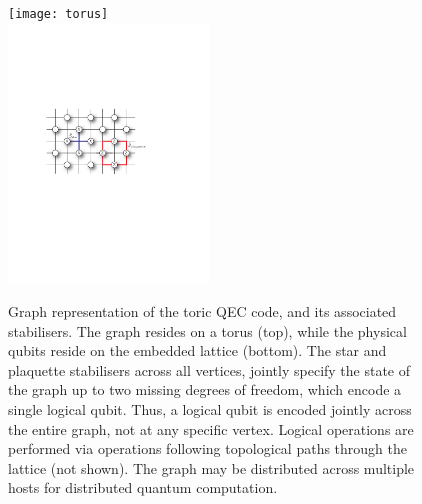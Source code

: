\doublecol
	\begin{figure}[!htbp]
		\texttt{[image: torus]}\\
		\includegraphics[clip=true, width=0.475\textwidth]{toric_code}
		\captionspacefig \caption{Graph representation of the toric QEC code, and its associated stabilisers. The graph resides on a torus (top), while the physical qubits reside on the embedded lattice (bottom). The star and plaquette stabilisers across all vertices, jointly specify the state of the graph up to two missing degrees of freedom, which encode a single logical qubit. Thus, a logical qubit is encoded jointly across the entire graph, not at any specific vertex. Logical operations are performed via operations following topological paths through the lattice (not shown). The graph may be distributed across multiple hosts for distributed quantum computation.} \label{fig:toric_code}
	\end{figure}
\else
